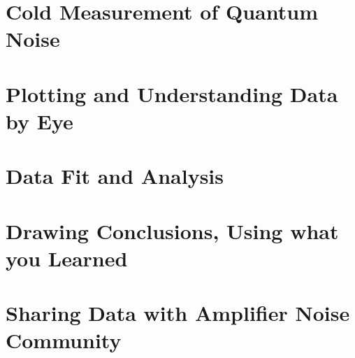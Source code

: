 \documentclass[11pt]{article}
\begin{document}
\section{
Cold Measurement of Quantum Noise}


\section{
Plotting and Understanding Data by Eye}


\section{
Data Fit and Analysis}


\section{
Drawing Conclusions, Using what you Learned}



\section{
Sharing Data with Amplifier Noise Community}
\end{document}
